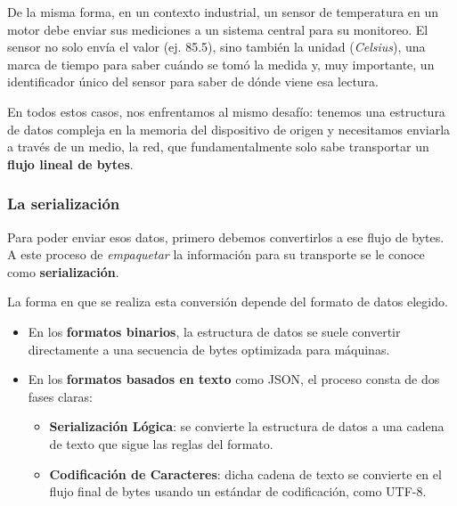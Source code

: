\begin{center}
\end{center}

De la misma forma, en un contexto industrial, un sensor de temperatura en un motor debe enviar sus mediciones a un sistema central para su monitoreo. El sensor no solo envía el valor (ej. 85.5), sino también la unidad (\emph{Celsius}), una marca de tiempo para saber cuándo se tomó la medida y, muy importante, un identificador único del sensor para saber de dónde viene esa lectura.

\begin{center}
\end{center}

En todos estos casos, nos enfrentamos al mismo desafío: tenemos una estructura de datos compleja en la memoria del dispositivo de origen y necesitamos enviarla a través de un medio, la red, que fundamentalmente solo sabe transportar un \textbf{flujo lineal de bytes}.

\subsubsection{La serialización}
Para poder enviar esos datos, primero debemos convertirlos a ese flujo de bytes. A este proceso de \textit{empaquetar} la información para su transporte se le conoce como \textbf{serialización}.

La forma en que se realiza esta conversión depende del formato de datos elegido.
\begin{itemize}
    \item En los \textbf{formatos binarios}, la estructura de datos se suele convertir directamente a una secuencia de bytes optimizada para máquinas.
    \item En los \textbf{formatos basados en texto} como JSON, el proceso consta de dos fases claras:
    \begin{itemize}
        \item \textbf{Serialización Lógica}: se convierte la estructura de datos a una cadena de texto que sigue las reglas del formato.
        \item \textbf{Codificación de Caracteres}: dicha cadena de texto se convierte en el flujo final de bytes usando un estándar de codificación, como UTF-8.
    \end{itemize}
\end{itemize}


